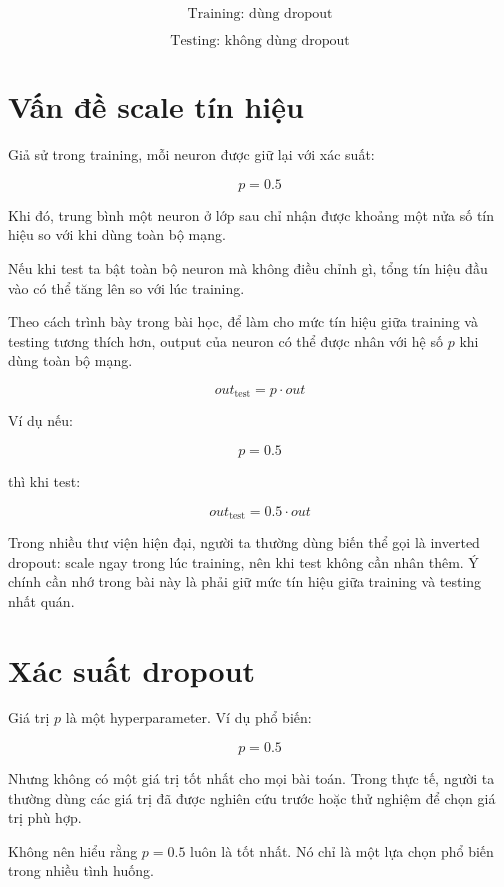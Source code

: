 \documentclass[12pt,a4paper]{report}
\begin{document}
\[
    \text{Training: dùng dropout}
\]

\[
    \text{Testing: không dùng dropout}
\]

\section{Vấn đề scale tín hiệu}

Giả sử trong training, mỗi neuron được giữ lại với xác suất:

\[
    p=0.5
\]

Khi đó, trung bình một neuron ở lớp sau chỉ nhận được khoảng một nửa số tín hiệu so với khi dùng toàn bộ mạng.

Nếu khi test ta bật toàn bộ neuron mà không điều chỉnh gì, tổng tín hiệu đầu vào có thể tăng lên so với lúc training.

Theo cách trình bày trong bài học, để làm cho mức tín hiệu giữa training và testing tương thích hơn, output của neuron có thể được nhân với hệ số $p$ khi dùng toàn bộ mạng.

\[
    out_{\text{test}} = p \cdot out
\]

Ví dụ nếu:

\[
    p=0.5
\]

thì khi test:

\[
    out_{\text{test}}=0.5\cdot out
\]

\begin{luuy}
Trong nhiều thư viện hiện đại, người ta thường dùng biến thể gọi là inverted dropout: scale ngay trong lúc training, nên khi test không cần nhân thêm. Ý chính cần nhớ trong bài này là phải giữ mức tín hiệu giữa training và testing nhất quán.
\end{luuy}

\section{Xác suất dropout}

Giá trị $p$ là một hyperparameter. Ví dụ phổ biến:

\[
    p=0.5
\]

Nhưng không có một giá trị tốt nhất cho mọi bài toán. Trong thực tế, người ta thường dùng các giá trị đã được nghiên cứu trước hoặc thử nghiệm để chọn giá trị phù hợp.

\begin{luuy}
Không nên hiểu rằng $p=0.5$ luôn là tốt nhất. Nó chỉ là một lựa chọn phổ biến trong nhiều tình huống.
\end{luuy}
\end{document}
